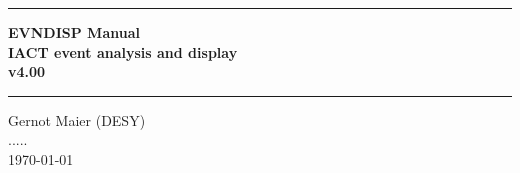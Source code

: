 
\newcommand{\HRule}{\rule{\linewidth}{1mm}}

\begin{titlepage}
\thispagestyle{empty}
\setlength{\parindent}{0mm}
\setlength{\parskip}{0mm}

\vspace*{10mm}
\HRule
\begin{flushright}
 \Huge \bf
  EVNDISP Manual \\
    IACT event analysis and display \\
     v4.00
\end{flushright}
\HRule
\vspace{10mm}
\begin{center}
   \Large
   
   \vspace{3.5cm}
  
   \vspace{0.5cm}
    
   \vspace{0.5cm}
   Gernot Maier (DESY) \\
   .....\\
   \today \\

   \vspace{6.3cm}

\end{center}
\begin{flushleft}
\Large

\end{flushleft}

%

\end{titlepage}
